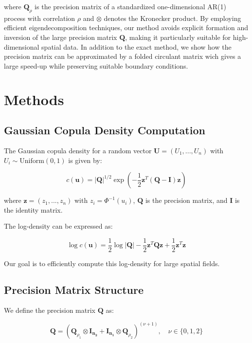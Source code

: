\documentclass[
  letterpaper,
  DIV=11,
  numbers=noendperiod]{scrartcl}
\begin{document}
where \(\mathbf{Q}_\rho\) is the precision matrix of a standardized
one-dimensional AR(1) process with correlation \(\rho\) and \(\otimes\)
denotes the Kronecker product. By employing efficient eigendecomposition
techniques, our method avoids explicit formation and inversion of the
large precision matrix \(\mathbf{Q}\), making it particularly suitable
for high-dimensional spatial data. In addition to the exact method, we
show how the precision matrix can be approximated by a folded circulant
matrix wich gives a large speed-up while preserving suitable boundary
conditions.

\section{Methods}\label{methods}

\subsection{Gaussian Copula Density
Computation}\label{gaussian-copula-density-computation}

The Gaussian copula density for a random vector
\(\mathbf{U} = (U_1, ..., U_n)\) with \(U_i \sim \text{Uniform}(0,1)\)
is given by:

\[
c(\mathbf{u}) = |\mathbf{Q}|^{1/2} \exp\left(-\frac{1}{2}\mathbf{z}^T(\mathbf{Q} - \mathbf{I})\mathbf{z}\right)
\]

where \(\mathbf{z} = (z_1, ..., z_n)\) with \(z_i = \Phi^{-1}(u_i)\),
\(\mathbf{Q}\) is the precision matrix, and \(\mathbf{I}\) is the
identity matrix.

The log-density can be expressed as:

\[
\log c(\mathbf{u}) = \frac{1}{2}\log|\mathbf{Q}| - \frac{1}{2}\mathbf{z}^T\mathbf{Q}\mathbf{z} + \frac{1}{2}\mathbf{z}^T\mathbf{z}
\]

Our goal is to efficiently compute this log-density for large spatial
fields.

\subsection{Precision Matrix
Structure}\label{precision-matrix-structure}

We define the precision matrix \(\mathbf{Q}\) as:

\[
\mathbf{Q} = (\mathbf{Q}_{\rho_1} \otimes \mathbf{I_{n_2}} + \mathbf{I_{n_1}} \otimes \mathbf{Q}_{\rho_2})^{(\nu + 1)}, \quad \nu \in \{0, 1, 2\}
\]
\end{document}
